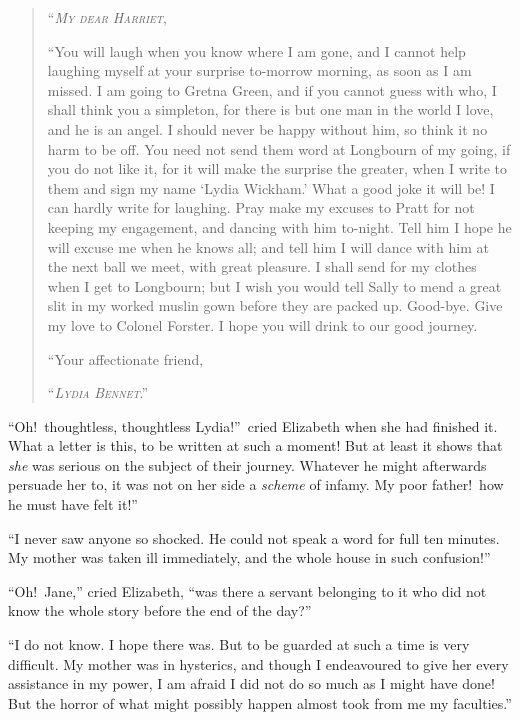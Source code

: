\documentclass[12pt,english,oneside]{book}
\newcommand{\noun}[1]{\textsc{#1}}
\begin{document}
\begin{quotation}
\noindent {}``\textit{\emph{\noun{My}}} \textit{\emph{\noun{dear}}}
\textit{\emph{\noun{Harriet}}},

{}``You will laugh when you know where I am gone, and I cannot help
laughing myself at your surprise to-morrow morning, as soon as I am
missed. I am going to Gretna Green, and if you cannot guess with who,
I shall think you a simpleton, for there is but one man in the world
I love, and he is an angel. I should never be happy without him, so
think it no harm to be off. You need not send them word at Longbourn
of my going, if you do not like it, for it will make the surprise
the greater, when I write to them and sign my name `Lydia Wickham.'
What a good joke it will be! I can hardly write for laughing. Pray
make my excuses to Pratt for not keeping my engagement, and dancing
with him to-night. Tell him I hope he will excuse me when he knows
all; and tell him I will dance with him at the next ball we meet,
with great pleasure. I shall send for my clothes when I get to Longbourn;
but I wish you would tell Sally to mend a great slit in my worked
muslin gown before they are packed up. Good-bye. Give my love to Colonel
Forster. I hope you will drink to our good journey.

{}``Your affectionate friend,

``\textit{\emph{\noun{Lydia}}} \textit{\emph{\noun{Bennet}}}.'' 
\end{quotation}
{}``Oh!\ thoughtless, thoughtless Lydia!''\ cried Elizabeth when
she had finished it. What a letter is this, to be written at such
a moment! But at least it shows that \textit{she} was serious on the
subject of their journey. Whatever he might afterwards persuade her
to, it was not on her side a \textit{scheme} of infamy. My poor father!\ how
he must have felt it!''\ 

{}``I never saw anyone so shocked. He could not speak a word for
full ten minutes. My mother was taken ill immediately, and the whole
house in such confusion!''\ 

{}``Oh!\ Jane,'' cried Elizabeth, {}``was there a servant belonging
to it who did not know the whole story before the end of the day?''\ 

{}``I do not know. I hope there was. But to be guarded at such a
time is very difficult. My mother was in hysterics, and though I endeavoured
to give her every assistance in my power, I am afraid I did not do
so much as I might have done! But the horror of what might possibly
happen almost took from me my faculties.''
\end{document}

